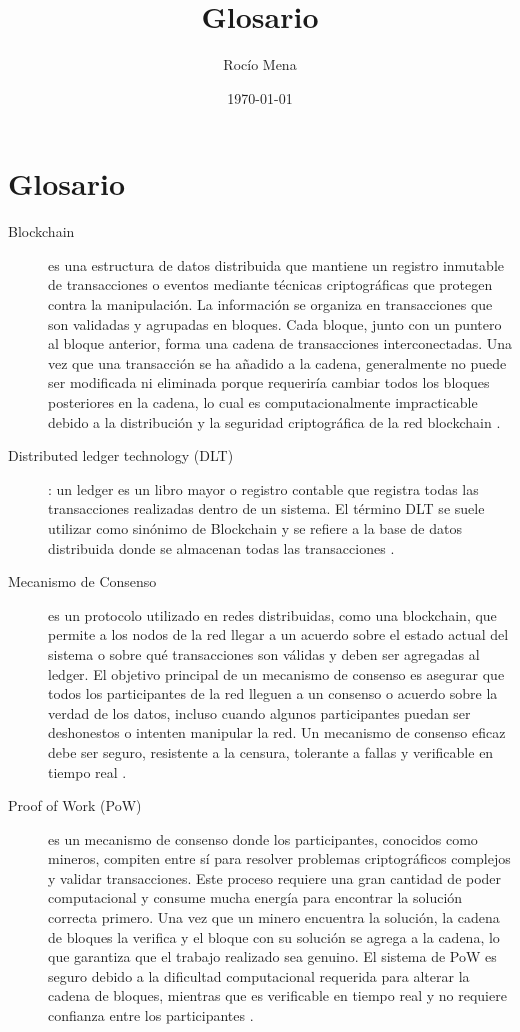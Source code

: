 \documentclass{article}
\title{Glosario}
\author{Rocío Mena}
\date{\today}
\begin{document}
\maketitle

\section{Glosario}


\begin{description}
	\item[Blockchain] es una estructura de datos distribuida que mantiene un registro inmutable de transacciones o eventos mediante técnicas criptográficas que protegen contra la manipulación. La información se organiza en transacciones que son validadas y agrupadas en bloques. Cada bloque, junto con un puntero al bloque anterior, forma una cadena de transacciones interconectadas. Una vez que una transacción se ha añadido a la cadena, generalmente no puede ser modificada ni eliminada porque requeriría cambiar todos los bloques posteriores en la cadena, lo cual es computacionalmente impracticable debido a la distribución y la seguridad criptográfica de la red blockchain \cite{rennock2018blockchain}.

	\item[Distributed ledger technology (DLT)]: un ledger es un libro mayor o registro contable que registra todas las transacciones realizadas dentro de un sistema. El término DLT se suele utilizar como sinónimo de Blockchain y se refiere a la base de datos distribuida donde se almacenan todas las transacciones \cite{rennock2018blockchain}.

	\item[Mecanismo de Consenso] es un protocolo utilizado en redes distribuidas, como una blockchain, que permite a los nodos de la red llegar a un acuerdo sobre el estado actual del sistema o sobre qué transacciones son válidas y deben ser agregadas al ledger. El objetivo principal de un mecanismo de consenso es asegurar que todos los participantes de la red lleguen a un consenso o acuerdo sobre la verdad de los datos, incluso cuando algunos participantes puedan ser deshonestos o intenten manipular la red. Un mecanismo de consenso eficaz debe ser seguro, resistente a la censura, tolerante a fallas y verificable en tiempo real \cite{diaz2022protocolos}.

	\item[Proof of Work (PoW)] es un mecanismo de consenso donde los participantes, conocidos como mineros, compiten entre sí para resolver problemas criptográficos complejos y validar transacciones. Este proceso requiere una gran cantidad de poder computacional y consume mucha energía para encontrar la solución correcta primero. Una vez que un minero encuentra la solución, la cadena de bloques la verifica y el bloque con su solución se agrega a la cadena, lo que garantiza que el trabajo realizado sea genuino. El sistema de PoW es seguro debido a la dificultad computacional requerida para alterar la cadena de bloques, mientras que es verificable en tiempo real y no requiere confianza entre los participantes \cite{rennock2018blockchain}.


\end{description}
\end{document}
